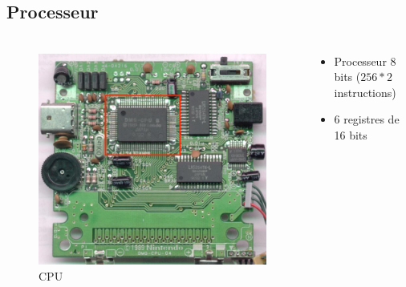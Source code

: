 \documentclass{beamer}
\begin{document}

\subsection{Processeur}
\begin{frame}
	\frametitle{\secname}
  \framesubtitle{\subsecname}
  \begin{columns}[T]
		\begin{column}{.30\textwidth}
			\begin{figure}
				\includegraphics[width=1\textwidth]{images/cpu.jpg}
				\caption{CPU}
			\end{figure}
		\end{column}
		\begin{column}{.70\textwidth}
      \begin{itemize}
        \item Processeur 8 bits ($256*2$ instructions)
        \item 6 registres de 16 bits
      \end{itemize}
      \begin{center}
\end{center}
\end{column}
\end{columns}
\end{frame}
\end{document}
